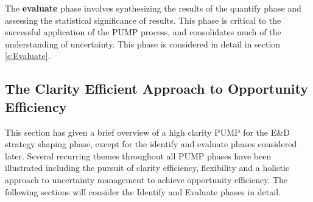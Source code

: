 The \textbf{evaluate} phase involves synthesizing the results of the quantify phase and assessing the statistical significance of results.
This phase is critical to the successful application of the PUMP process, and consolidates much of the understanding of uncertainty.
This phase is considered in detail in section \ref{s:Evaluate}.


\subsection{The Clarity Efficient Approach to Opportunity Efficiency}
This section has given a brief overview of a high clarity PUMP for the E\&D strategy shaping phase, except for the identify and evaluate phases considered later.
Several recurring themes throughout all PUMP phases have been illustrated including the pursuit of clarity efficiency, flexibility and a holistic approach to uncertainty management to achieve opportunity efficiency.
The following sections will consider the Identify and Evaluate phases in detail.


